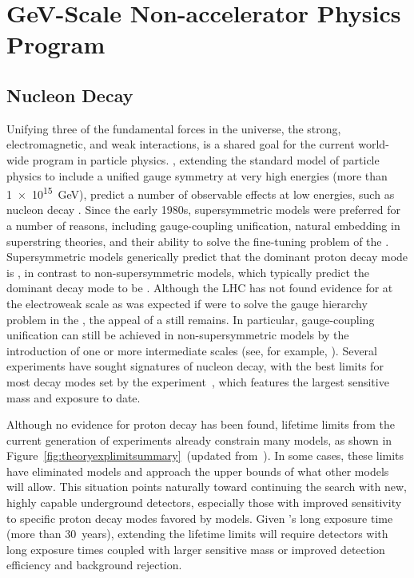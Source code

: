 \chapter{GeV-Scale Non-accelerator Physics Program}
\label{ch:nonaccel}


\section{Nucleon Decay}
\label{sec:nonaccel-ndk}

Unifying three of the fundamental forces in the universe, the strong, 
electromagnetic, and weak interactions, is a shared goal for the current 
world-wide program in particle physics. , extending the standard model of particle physics to include a unified gauge symmetry 
at very high energies  (more than \SI{1e15}{\GeV}), predict a number of observable 
effects at low energies, such as nucleon  decay \cite{Pati:1973rp,Georgi:1974sy,Dimopoulos:1981dw,Langacker:1980js,deBoer:1994dg,Nath:2006ut}. 
Since the early 1980s, supersymmetric  models were preferred for a number of reasons, including gauge-coupling unification, natural embedding in superstring theories, and their ability to solve the fine-tuning problem of the .  Supersymmetric  models generically predict that the dominant proton decay mode is \ptoknubar, in contrast to non-supersymmetric  models, which typically predict
the dominant decay mode to be \ptoepizero.  Although the LHC has not found evidence for  at the electroweak scale as was expected if  were to solve the gauge hierarchy problem in the , the appeal of a  still remains. In particular, gauge-coupling unification can still be achieved in non-supersymmetric  models by the introduction of one or more intermediate scales (see, for example, \cite{Altarelli:2013aqa}).
Several experiments have sought signatures of nucleon decay, with the best limits for most decay modes set by the \superk experiment~\cite{Abe:2014mwa,Miura:2016krn,TheSuper-Kamiokande:2017tit}, 
which features the largest sensitive mass and exposure to date. 

Although no evidence for proton decay has been found, lifetime limits from the current generation of experiments already constrain many  models, as shown in Figure~\ref{fig:theoryexplimitsummary}~(updated from~\cite{Babu:2013jba}). In some cases, these limits have eliminated models and approach the upper bounds of what other models will allow. This situation points naturally toward continuing the search with new, highly capable underground detectors, especially those with improved sensitivity to specific proton decay modes favored by  models. Given \superk's long exposure time (more than \SI{30}{years}), extending the lifetime limits will require detectors with long exposure times coupled with larger sensitive mass or improved detection efficiency and background rejection.  

